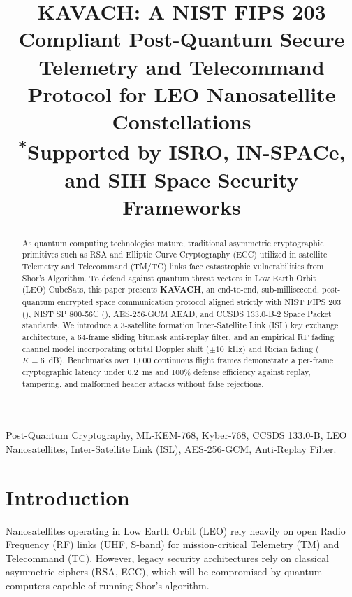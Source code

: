 \documentclass[conference]{IEEEtran}
\begin{document}
\title{KAVACH: A NIST FIPS 203 Compliant Post-Quantum Secure Telemetry and Telecommand Protocol for LEO Nanosatellite Constellations\\
{\footnotesize \textsuperscript{*}Supported by ISRO, IN-SPACe, and SIH Space Security Frameworks}
}

\author{
}

\maketitle

\begin{abstract}
As quantum computing technologies mature, traditional asymmetric cryptographic primitives such as RSA and Elliptic Curve Cryptography (ECC) utilized in satellite Telemetry and Telecommand (TM/TC) links face catastrophic vulnerabilities from Shor's Algorithm. To defend against quantum threat vectors in Low Earth Orbit (LEO) CubeSats, this paper presents \textbf{KAVACH}, an end-to-end, sub-millisecond, post-quantum encrypted space communication protocol aligned strictly with NIST FIPS 203 (), NIST SP 800-56C (), AES-256-GCM AEAD, and CCSDS 133.0-B-2 Space Packet standards. We introduce a 3-satellite formation Inter-Satellite Link (ISL) key exchange architecture, a 64-frame sliding bitmask anti-replay filter, and an empirical RF fading channel model incorporating orbital Doppler shift ($\pm 10$~kHz) and Rician fading ($K=6$~dB). Benchmarks over 1,000 continuous flight frames demonstrate a per-frame cryptographic latency under 0.2~ms and 100\% defense efficiency against replay, tampering, and malformed header attacks without false rejections.
\end{abstract}

\begin{IEEEkeywords}
Post-Quantum Cryptography, ML-KEM-768, Kyber-768, CCSDS 133.0-B, LEO Nanosatellites, Inter-Satellite Link (ISL), AES-256-GCM, Anti-Replay Filter.
\end{IEEEkeywords}

\section{Introduction}
Nanosatellites operating in Low Earth Orbit (LEO) rely heavily on open Radio Frequency (RF) links (UHF, S-band) for mission-critical Telemetry (TM) and Telecommand (TC). However, legacy security architectures rely on classical asymmetric ciphers (RSA, ECC), which will be compromised by quantum computers capable of running Shor's algorithm.
\end{document}
